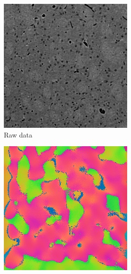 \documentclass[11pt]{article}
\begin{document}
\begin{figure}[h]
  \centering
  \begin{subfigure}[b]{0.30\textwidth}
    \centering \includegraphics[width=\textwidth]{../figs/xray_sl84}
    \caption{Raw data\label{fig:xray}}
  \end{subfigure}
  \hspace{1em}
  \begin{subfigure}[b]{0.3\textwidth}
    \centering \includegraphics[width=\textwidth]{../figs/RGB_raw_d2_n7_sl84}

\end{subfigure}
\end{figure}
\end{document}
